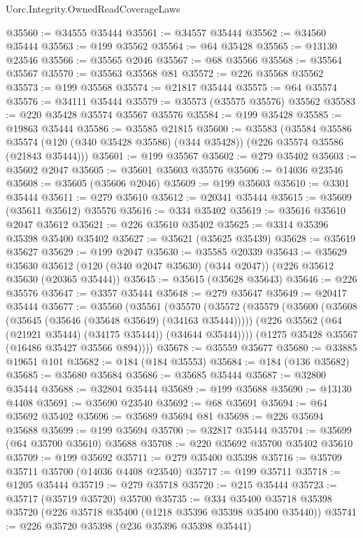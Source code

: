 \begin{lexlean}{Uorc.Integrity.OwnedReadCoverageLaws}
\begin{coremodule}
@35560 := @34555 @35444
@35561 := @34557 @35444
@35562 := @34560 @35444
@35563 := @199 @35562
@35564 := @64 @35428
@35565 := @13130 @23546
@35566 := @35565 @2046
@35567 := @68 @35566
@35568 := @35564 @35567
@35570 := @35563 @35568 @81
@35572 := @226 @35568 @35562
@35573 := @199 @35568
@35574 := @21817 @35444
@35575 := @64 @35574
@35576 := @34111 @35444
@35579 := @35573 (@35575 @35576) @35562
@35583 := @220 @35428 @35574 @35567 @35576
@35584 := @199 @35428
@35585 := @19863 @35444
@35586 := @35585 @21815
@35600 := @35583
    (@35584
      @35586
      @35574
      (@120 (@340 @35428 @35586) (@344 @35428))
      (@226 @35574 @35586 (@21843 @35444)))
@35601 := @199 @35567
@35602 := @279 @35402
@35603 := @35602 @2047
@35605 := @35601 @35603 @35576
@35606 := @14036 @23546
@35608 := @35605 (@35606 @2046)
@35609 := @199 @35603
@35610 := @3301 @35444
@35611 := @279 @35610
@35612 := @20341 @35444
@35615 := @35609 (@35611 @35612) @35576
@35616 := @334 @35402
@35619 := @35616 @35610 @2047 @35612
@35621 := @226 @35610 @35402
@35625 := @3314 @35396 @35398 @35400 @35402
@35627 := @35621 (@35625 @35439)
@35628 := @35619 @35627
@35629 := @199 @2047
@35630 := @35585 @20339
@35643 := @35629
    @35630
    @35612
    (@120 (@340 @2047 @35630) (@344 @2047))
    (@226 @35612 @35630 (@20365 @35444))
@35645 := @35615 (@35628 @35643)
@35646 := @226 @35576
@35647 := @3357 @35444
@35648 := @279 @35647
@35649 := @20417 @35444
@35677 := @35560
    (@35561
      (@35570
        (@35572
          (@35579
            (@35600 (@35608 (@35645 (@35646 (@35648 @35649) (@34163 @35444)))))
            (@226 @35562 (@64 (@21921 @35444) (@34175 @35444)) (@34644 @35444))))
        (@1275 @35428 @35567 (@16486 @35427 @35566 @894))))
@35678 := @35559 @35677
@35680 := @33885 @19651 @101
@35682 := @184 (@184 @35553)
@35684 := @184 (@136 @35682)
@35685 := @35680 @35684
@35686 := @35685 @35444
@35687 := @32800 @35444
@35688 := @32804 @35444
@35689 := @199 @35688
@35690 := @13130 @4408
@35691 := @35690 @23540
@35692 := @68 @35691
@35694 := @64 @35692 @35402
@35696 := @35689 @35694 @81
@35698 := @226 @35694 @35688
@35699 := @199 @35694
@35700 := @32817 @35444
@35704 := @35699 (@64 @35700 @35610) @35688
@35708 := @220 @35692 @35700 @35402 @35610
@35709 := @199 @35692
@35711 := @279 @35400 @35398
@35716 := @35709 @35711 @35700 (@14036 @4408 @23540)
@35717 := @199 @35711
@35718 := @1205 @35444
@35719 := @279 @35718
@35720 := @215 @35444
@35723 := @35717 (@35719 @35720) @35700
@35735 := @334 @35400 @35718 @35398 @35720 (@226 @35718 @35400 (@1218 @35396 @35398 @35400 @35440))
@35741 := @226 @35720 @35398 (@236 @35396 @35398 @35441)

\end{coremodule}
\end{lexlean}
